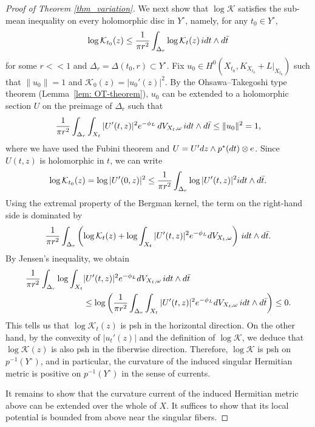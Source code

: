 \documentclass[a4paper, 11pt]{amsart}
\theoremstyle{plain}
\numberwithin{equation}{section} %
\numberwithin{figure}{section} %
\theoremstyle{plain}
\theoremstyle{plain}
\theoremstyle{plain}
\theoremstyle{plain}
\theoremstyle{remark}
\theoremstyle{definition}
\theoremstyle{definition}
\newcommand{\K}{\mathcal{K}}
\newcommand{\X}{\mathcal{X}}
\begin{document}
\begin{proof}[Proof of Theorem \ref{thm_variation}]
\medskip 
We next show that $\log \K$ satisfies the sub-mean inequality on every holomorphic disc in $Y^\circ$, namely, for any $t_0\in Y^\circ$,
\[ \log \K_{t_0}(z)\leq \frac{1}{\pi r^2} \int_{\Delta_r}\log \K_{t}(z) \,i {\rm d}t\wedge {\rm d}\Bar{t}\] for some $r<<1$ and $\Delta_r=\Delta(t_0,r)\subset Y^\circ$. Fix $u_0\in H^0(X_{t_0},K_{X_{t_0}}+ L|_{X_{t_0}})$ such that $\|u_0\|=1$ and $\K_0(z)=|u_0'(z)|^2$. By the Ohsawa--Takegoshi type theorem (Lemma~\ref{lem: OT-theorem}), $u_0$ can be extended to a holomorphic section $U$ on the preimage of $\Delta_r$ such that 
\[ \frac{1}{\pi r^2}\int_{\Delta_r}\int_{X_t} |U'(t,z)|^2e^{-\phi_L} \,{\rm d}V_{X_t,\omega}\, i{\rm d}t\wedge {\rm d}\Bar{t}\leq \|u_0\|^2= 1, \]
where we have used the Fubini theorem and $U=U'dz\wedge p^*({\rm d}t)\otimes e$.
Since $U(t,z)$ is holomorphic in $t$, we can write 
\[ \log \K_{t_0}(z)=\log |U'(0,z)|^2\leq \frac{1}{\pi r^2}\int_{\Delta_r}\log |U'(t,z)|^2 i {\rm d}t\wedge {\rm d}\Bar{t}.\]
Using the extremal property of the Bergman kernel, the term on the right-hand side is dominated by
\[ \frac{1}{\pi r^2}\int_{\Delta_r}\left(\log \K_t(z)+\log \int_{X_t} |U'(t,z)|^2e^{-\phi_L} {\rm d}V_{X_t,\omega} \right)\, i {\rm d}t\wedge {\rm d}\Bar{t}.\]
By Jensen's inequality, we obtain 
\begin{align*}
    \frac{1}{\pi r^2}\int_{\Delta_r} \log \int_{X_t}& |U'(t,z)|^2e^{-\phi_L} {\rm d}V_{X_t,\omega}\, i{\rm d}t\wedge {\rm d}\Bar{t}\\
    &\leq\log \left( \frac{1}{\pi r^2}\int_{\Delta_r}\int_{X_t} |U'(t,z)|^2e^{-\phi_L} {\rm d}V_{X_t,\omega}\, i{\rm d}t\wedge d\Bar{t}\right) \leq 0.
\end{align*}
This tells us that $\log\K_t(z)$ is psh in the horizontal direction. On the other hand, by the convexity of  $|u_t'(z)|$ and the definition of $\log \K$, we deduce that $\log\K(z)$ is also psh in the fiberwise direction. Therefore, $\log\K$ is psh on $p^{-1}(Y^\circ)$, and in particular, the curvature of the induced singular Hermitian metric is positive on $p^{-1}(Y^\circ)$ in the sense of currents.   

It remains to show that the curvature current of the induced Hermitian metric above can be extended over the whole of $X$. It suffices to show that its local potential is bounded from above near the singular fibers. 


\end{proof}
\end{document}
